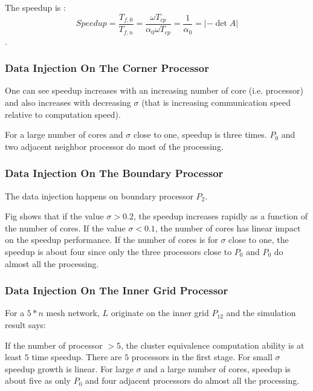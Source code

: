 The speedup is :
$$Speedup = \frac{T_{f, 0}}{T_{f, n}}= \frac{\omega T_{cp}}{\alpha_{0}\omega T_{cp}} = \frac{1}{\alpha_{0}} = \left |-\det A \right |$$.

\subsubsection{Data Injection On The Corner Processor}

One can see speedup increases with an increasing number of core (i.e. processor) and also increases with decreasing $\sigma$ (that is increasing communication speed relative to computation speed).

For a large number of cores and $\sigma$ close to one, speedup is three times. $P_{0}$ and two adjacent neighbor processor do most of the processing.


\subsubsection{Data Injection On The Boundary Processor}
The data injection happens on boundary processor $P_{2}$. 


Fig shows that if the value $\sigma > 0.2$, the speedup increases rapidly as a function of the number of cores.  If the value $\sigma < 0.1$, the number of cores has linear impact on the speedup performance.  If the number of cores is for $\sigma$ close to one, the speedup is about four since only the three processors close to $P_{0}$ and $P_{0}$ do almost all the processing.

\subsubsection{Data Injection On The Inner Grid Processor}
For a $5*n$ mesh network, $L$ originate on the inner grid $P_{12}$ and the simulation result says:



If the number of processor $ > 5$, the cluster equivalence computation ability is at least $5$ time speedup.  There are $5$ processors in the first stage.  For small $\sigma$ speedup growth is linear.  For large $\sigma$ and a large number of cores, speedup is about five as only $P_{0}$ and four adjacent processors do almost all the processing. 